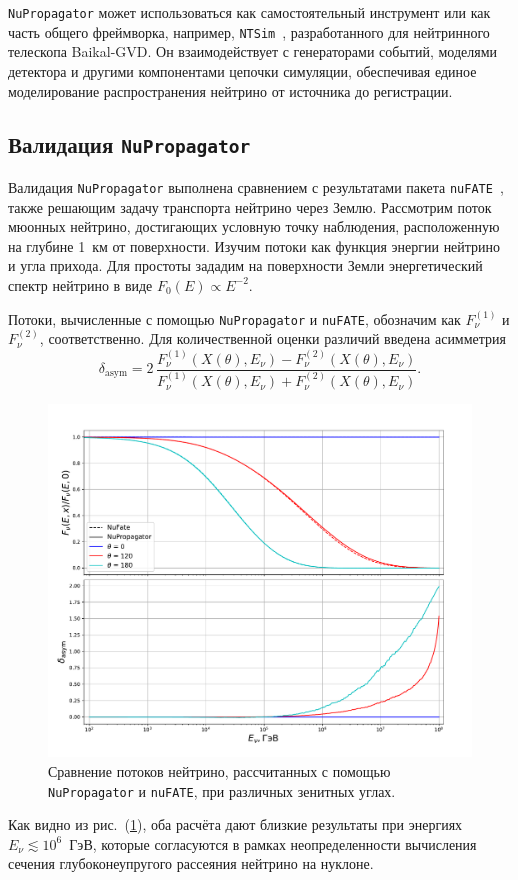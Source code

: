 \texttt{NuPropagator} может использоваться как самостоятельный инструмент или как часть общего фреймворка, например, \texttt{NTSim}~\cite{naumov2025_ntsim}, разработанного для нейтринного телескопа Baikal-GVD. 
Он взаимодействует с генераторами событий, моделями детектора и другими компонентами цепочки симуляции, обеспечивая единое моделирование распространения нейтрино от источника до регистрации.

\subsection{Валидация \texttt{NuPropagator}}
Валидация \texttt{NuPropagator} выполнена сравнением с результатами  пакета \texttt{nuFATE}~\cite{Vincent_2017}, также решающим задачу транспорта нейтрино через Землю. Рассмотрим поток мюонных нейтрино, достигающих условную точку наблюдения,  расположенную на глубине 1~км от поверхности. Изучим потоки как функция энергии нейтрино и угла прихода. Для простоты зададим на поверхности Земли энергетический спектр  нейтрино в виде $F_0(E) \propto E^{-2}$.  

Потоки, вычисленные с помощью \texttt{NuPropagator} и \texttt{nuFATE}, обозначим как $F_\nu^{(1)}$ и $F_\nu^{(2)}$, соответственно. 
Для количественной оценки различий введена асимметрия
\begin{equation}
\delta_{\text{asym}} = 
2\,\frac{F_\nu^{(1)}(X(\theta),E_\nu) - F_\nu^{(2)}(X(\theta),E_\nu)}
       {F_\nu^{(1)}(X(\theta),E_\nu) + F_\nu^{(2)}(X(\theta),E_\nu)}.
\end{equation}

\begin{figure}[!h]
\centering
\includegraphics[width=0.8\linewidth]{images/NuProp/compNuandNu.pdf}
\caption{Сравнение потоков нейтрино, рассчитанных с помощью \texttt{NuPropagator} и \texttt{nuFATE}, при различных зенитных углах.}
\label{fig:flux_compare}
\end{figure}

Как видно из рис.~(\ref{fig:flux_compare}), оба расчёта дают близкие результаты при энергиях $E_\nu \lesssim 10^6$~ГэВ, которые согласуются в рамках неопределенности вычисления сечения глубоконеупругого рассеяния нейтрино на нуклоне. 
